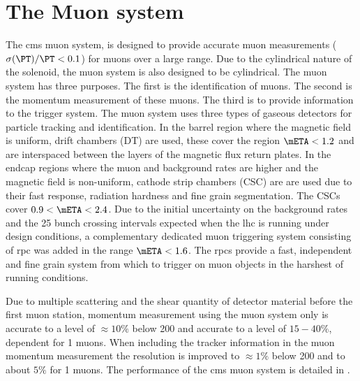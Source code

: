 \section{The  Muon system} %
\label{sec:the_cms_muon_system}
The \ac{cms} muon system, is designed to provide accurate muon \PT measurements
($\sigma(\PT)/\PT < 0.1$) for muons over a large \PT range. Due to the
cylindrical nature of the solenoid, the muon system is also designed to be
cylindrical. The muon system has three purposes. The first is the identification
of muons. The second is the momentum measurement of these muons. The third is to
provide information to the trigger system.
The muon system uses three types of gaseous detectors for particle tracking and
identification. In the barrel region where the magnetic field is uniform, drift
chambers (DT) are used, these cover the region $\mETA < 1.2$ and are
interspaced between the layers of the magnetic flux return plates. In the 
endcap regions where the muon and background rates are higher and the magnetic
field is non-uniform, cathode strip chambers (CSC) are are used due to their
fast response, radiation hardness and fine grain segmentation. The CSCs cover
$0.9 < \mETA < 2.4$. Due to the initial uncertainty on the background rates and
the \unit{25}{\nano\second} bunch crossing intervals expected when the \ac{lhc}
is running under design conditions, a complementary dedicated muon triggering
system consisting of \ac{rpc} was added in the range $\mETA < 1.6$. The
\ac{rpc}s provide a fast, independent and fine grain system from
which to trigger on muon objects in the harshest of running conditions.

Due to multiple scattering and the shear quantity of detector material before
the first muon station, momentum measurement using the muon system only is
accurate to a level of $\approx10\%$ below \unit{200}{\GeV} and accurate to a
level of $15-40\%$, \mETA dependent  for \unit{1}{\TeV} muons. When including
the tracker information in the muon momentum measurement the resolution is
improved to $\approx1\%$ below \unit{200}{\GeV} and to about $5\%$ for
\unit{1}{\TeV} muons. The performance of the \ac{cms} muon system is detailed
in \cite{cmsMuPerf}.

